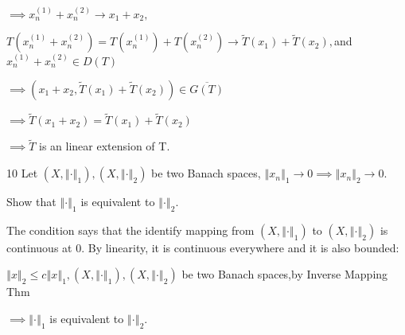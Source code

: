 \documentclass{article}
\begin{document}
\begin{CJK}{GBK}{song}
$\implies x_{n}^{\left( 1\right) }+x_{n}^{\left( 2\right) }\rightarrow
x_{1}+x_{2},$

$T\left( x_{n}^{\left( 1\right) }+x_{n}^{\left( 2\right) }\right) =T\left(
x_{n}^{\left( 1\right) }\right) +T\left( x_{n}^{\left( 2\right) }\right)
\rightarrow \tilde{T}\left( x_{1}\right) +\tilde{T}\left( x_{2}\right) ,$and 
$x_{n}^{\left( 1\right) }+x_{n}^{\left( 2\right) }\in D\left( T\right) $

$\implies \left( x_{1}+x_{2},\tilde{T}\left( x_{1}\right) +\tilde{T}\left(
x_{2}\right) \right) \in \overline{G\left( T\right) }$

$\implies \tilde{T}\left( x_{1}+x_{2}\right) =\tilde{T}\left( x_{1}\right) +%
\tilde{T}\left( x_{2}\right) $

$\implies \tilde{T}$ is an linear extension of T.

10 Let $\left( X,\left\Vert \cdot \right\Vert _{1}\right) ,\left(
X,\left\Vert \cdot \right\Vert _{2}\right) $ be two Banach spaces, $%
\left\Vert x_{n}\right\Vert _{1}\rightarrow 0\implies \left\Vert
x_{n}\right\Vert _{2}\rightarrow 0.$

Show that $\left\Vert \cdot \right\Vert _{1}$ is equivalent to $\left\Vert
\cdot \right\Vert _{2}.$

The condition says that the identify mapping from $\left( X,\left\Vert \cdot
\right\Vert _{1}\right) $ to $\left( X,\left\Vert \cdot \right\Vert
_{2}\right) $ is continuous at 0. By linearity, it is continuous everywhere
and it is also bounded:

$\left\Vert x\right\Vert _{2}\leq c\left\Vert x\right\Vert _{1},\left(
X,\left\Vert \cdot \right\Vert _{1}\right) ,\left( X,\left\Vert \cdot
\right\Vert _{2}\right) $ be two Banach spaces,by Inverse Mapping Thm

$\implies \left\Vert \cdot \right\Vert _{1}$ is equivalent to $\left\Vert
\cdot \right\Vert _{2}.$
\end{CJK}
\end{document}
